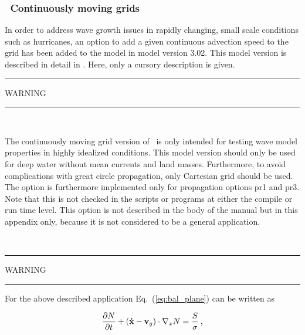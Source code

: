 \vsssub
\subsubsection{~Continuously moving grids} \label{sub:num_move}


\vspace{-\baselineskip} 
\vspace{\baselineskip} 

\noindent
In order to address wave growth issues in rapidly changing, small scale
conditions such as hurricanes, an option to add a given continuous advection
speed to the grid has been added to the model in model version 3.02. This
model version is described in detail in \cite{tol:OMOD05b}. Here, only a
cursory description is given.

\begin{center}
\rule[1mm]{55mm}{1.0mm} WARNING \rule[1mm]{55mm}{1.0mm} \\
 \vspace{\baselineskip}
\parbox{120mm}{The continuously moving grid version of \ws\ is only intended 
for testing wave model properties in highly idealized conditions. This model
version should only be used for deep water without mean currents and land
masses. Furthermore, to avoid complications with great circle propagation,
only Cartesian grid should be used. The option is furthermore implemented only
for propagation options {\F pr1} and {\F pr3}. Note that this is not checked
in the scripts or programs at either the compile or run time level.  This
option is not described in the body of the manual but in this appendix only,
because it is not considered to be a general application.} \\
\vspace{\baselineskip}
\rule[1mm]{55mm}{1.0mm} WARNING \rule[1mm]{55mm}{1.0mm}
\end{center}

\noindent
For the above described application Eq.~(\ref{eq:bal_plane}) can be written as

\begin{equation}
\frac{\partial N}{\partial t} + 
\left ( {\bf\dot{x}}-{\bf{v}}_g \right ) \cdot \nabla_x N  = 
\frac{S}{\sigma} \: , \label{eq:bal_move}
\end{equation}

